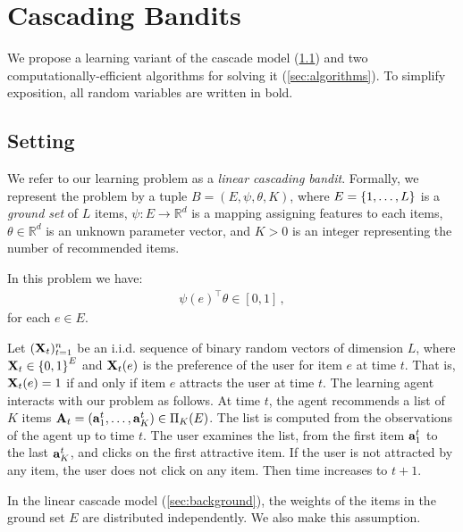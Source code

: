 
\section{Cascading Bandits}
\label{sec:cascading bandits}

We propose a learning variant of the cascade model (\cref{sec:setting}) and two computationally-efficient algorithms for solving it (\cref{sec:algorithms}). To simplify exposition, all random variables are written in bold.


\subsection{Setting}
\label{sec:setting}

We refer to our learning problem as a \emph{linear cascading bandit}. Formally, we represent the problem by a tuple $B = (E, \psi, \theta, K)$, where $E = \left\{1, \dots, L\right\}$ is a \emph{ground set} of $L$ items, $\psi : E \rightarrow \mathbb{R}^d$ is a mapping assigning features to each items, $\theta \in \mathbb{R}^d$ is an unknown parameter vector, and $K > 0$ is an integer representing the number of recommended items. 

\begin{assumption}
\label{ass:probability} In this problem we have:
\begin{align*}
  \psi(e)^\top \theta \in [0,1] \,,
\end{align*}
for each $e \in E$.
\end{assumption}

Let $(\mathbf{X}_t)_{t = 1}^n$ be an i.i.d. sequence of binary random vectors of dimension $L$, where $\mathbf{X}_t \in \left\{0, 1\right\}^E$ and $\mathbf{X}_t(e)$ is the preference of the user for item $e$ at time $t$. That is, $\mathbf{X}_t(e) = 1$ if and only if item $e$ attracts the user at time $t$. The learning agent interacts with our problem as follows. At time $t$, the agent recommends a list of $K$ items $\mathbf{A}_t = (\mathbf{a}^t_1, \dots, \mathbf{a}^t_K) \in \Pi_K(E)$. The list is computed from the observations of the agent up to time $t$. The user examines the list, from the first item $\mathbf{a}^t_1$ to the last $\mathbf{a}^t_K$, and clicks on the first attractive item. If the user is not attracted by any item, the user does not click on any item. Then time increases to $t + 1$.

In the linear cascade model (\cref{sec:background}), the weights of the items in the ground set $E$ are distributed independently. We also make this assumption.

